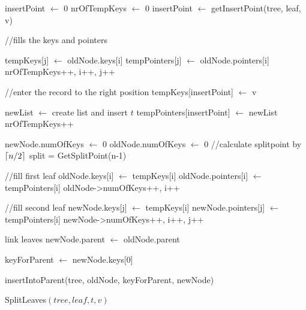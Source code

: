 \documentclass[abstracton,12pt,oneside]{scrreprt}
\DeclarePairedDelimiter\ceil{\lceil}{\rceil}
\begin{document}
\begin{algorithm}[H]
	\IncMargin{1em}
	\SetAlgoLined
	\DontPrintSemicolon
	
	
	
	insertPoint $\leftarrow$ 0\;
	nrOfTempKeys $\leftarrow$ 0\;
	insertPoint $\leftarrow$ getInsertPoint(tree, leaf, v)\;
	
	//fills the keys and pointers\;
	 {
		
		tempKeys[j] $\leftarrow$ oldNode.keys[i]\;
		tempPointers[j] $\leftarrow$ oldNode.pointers[i]\;
		nrOfTempKeys++, i++, j++\;
	}
	
	//enter the record to the right position\;
	tempKeys[insertPoint] $\leftarrow$ v\;
	
	newList $\leftarrow$ create list and insert $t$\;
	tempPointers[insertPoint] $\leftarrow$ newList\;
	nrOfTempKeys++\;
	
	newNode.numOfKeys $\leftarrow$ 0\;
	oldNode.numOfKeys $\leftarrow$ 0\;
	\BlankLine
	//calculate splitpoint by $\ceil{n/2}$\;
	split = GetSplitPoint(n-1)\;
	
	//fill first leaf\;
	 {
		oldNode.keys[i] $\leftarrow$ tempKeys[i]\;
		oldNode.pointers[i] $\leftarrow$ tempPointers[i]\;
		oldNode->numOfKeys++, i++\;
	}
	
	
	//fill second leaf\;
	 {
		newNode.keys[j] $\leftarrow$ tempKeys[i]\;
		newNode.pointers[j] $\leftarrow$ tempPointers[i]\;
		newNode->numOfKeys++, i++, j++\;
	}
	
	link leaves\;
	newNode.parent $\leftarrow$ oldNode.parent\;
	
	keyForParent $\leftarrow$ newNode.keys[0]\;
	
	insertIntoParent(tree, oldNode, keyForParent, newNode)\;
	
	
	
	
	\caption{SplitLeaves$(tree, leaf, t, v)$}	\label{SplitLeaves}
\end{algorithm}
\end{document}
